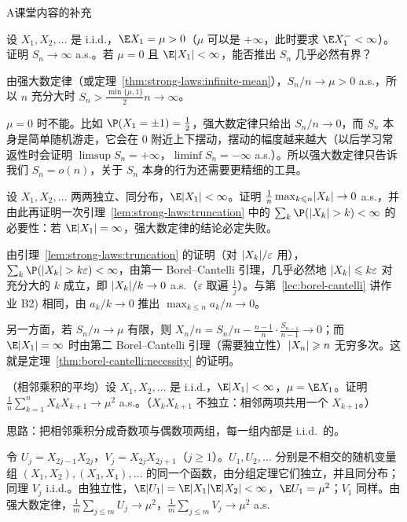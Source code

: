 \begin{exercises}{A}{课堂内容的补充}
\item\label{ex:strong-laws:A4} 设 $X_1,X_2,\dots$ 是 i.i.d.，$\E X_1=\mu>0$（$\mu$ 可以是 $+\infty$，此时要求 $\E X_1^-<\infty$）。证明 $S_n\to\infty$ a.s.。若 $\mu=0$ 且 $\E\abs{X_1}<\infty$，能否推出 $S_n$ 几乎必然有界？
\begin{solution}
由强大数定律（或定理~\ref{thm:strong-laws:infinite-mean}），$S_n/n\to\mu>0$ a.s.，所以 $n$ 充分大时 $S_n>\frac{\min\{\mu,1\}}2n\to\infty$。

$\mu=0$ 时不能。比如 $\P(X_1=\pm1)=\frac12$，强大数定律只给出 $S_n/n\to0$，而 $S_n$ 本身是简单随机游走，它会在 $0$ 附近上下摆动，摆动的幅度越来越大（以后学习常返性时会证明 $\limsup S_n=+\infty$，$\liminf S_n=-\infty$ a.s.）。所以强大数定律只告诉我们 $S_n=o(n)$，关于 $S_n$ 本身的行为还需要更精细的工具。
\end{solution}

\item\label{ex:strong-laws:A5} 设 $X_1,X_2,\dots$ 两两独立、同分布，$\E\abs{X_1}<\infty$。证明 $\frac1n\max_{k\leqslant n}\lvert X_k\rvert\to0$ a.s.，并由此再证明一次引理~\ref{lem:strong-laws:truncation} 中的 $\sum_k\P(\abs{X_k}>k)<\infty$ 的必要性：若 $\E\abs{X_1}=\infty$，强大数定律的结论必定失败。
\begin{solution}
由引理~\ref{lem:strong-laws:truncation} 的证明（对 $\lvert X_k\rvert/\varepsilon$ 用），$\sum_k\P(\abs{X_k}>k\varepsilon)<\infty$，由第一 Borel--Cantelli 引理，几乎必然地 $\lvert X_k\rvert\leqslant k\varepsilon$ 对充分大的 $k$ 成立，即 $\lvert X_k\rvert/k\to0$ a.s.（$\varepsilon$ 取遍 $\frac1j$）。与第~\ref{lec:borel-cantelli} 讲作业 B2) 相同，由 $a_k/k\to0$ 推出 $\max_{k\leqslant n}a_k/n\to0$。

另一方面，若 $S_n/n\to\mu$ 有限，则 $X_n/n=S_n/n-\frac{n-1}n\cdot\frac{S_{n-1}}{n-1}\to0$；而 $\E\abs{X_1}=\infty$ 时由第二 Borel--Cantelli 引理（需要独立性）$\lvert X_n\rvert\geqslant n$ 无穷多次。这就是定理~\ref{thm:borel-cantelli:necessity} 的证明。
\end{solution}

\item\label{ex:strong-laws:A6} （相邻乘积的平均）设 $X_1,X_2,\dots$ 是 i.i.d.，$\E\abs{X_1}<\infty$，$\mu=\E X_1$。证明 $\frac1n\sum_{k=1}^nX_kX_{k+1}\to\mu^2$ a.s.。（$X_kX_{k+1}$ 不独立：相邻两项共用一个 $X_{k+1}$。）
\begin{solution}
思路：把相邻乘积分成奇数项与偶数项两组，每一组内部是 i.i.d.\ 的。

令 $U_j=X_{2j-1}X_{2j}$，$V_j=X_{2j}X_{2j+1}$（$j\geqslant1$）。$U_1,U_2,\dots$ 分别是不相交的随机变量组 $(X_1,X_2),(X_3,X_4),\dots$ 的同一个函数，由分组定理它们独立，并且同分布；同理 $V_j$ i.i.d.。由独立性，$\E\abs{U_1}=\E\abs{X_1}\E\abs{X_2}<\infty$，$\E U_1=\mu^2$；$V_1$ 同样。由强大数定律，$\frac1m\sum_{j\leqslant m}U_j\to\mu^2$，$\frac1m\sum_{j\leqslant m}V_j\to\mu^2$ a.s.


\end{solution}
\end{exercises}
